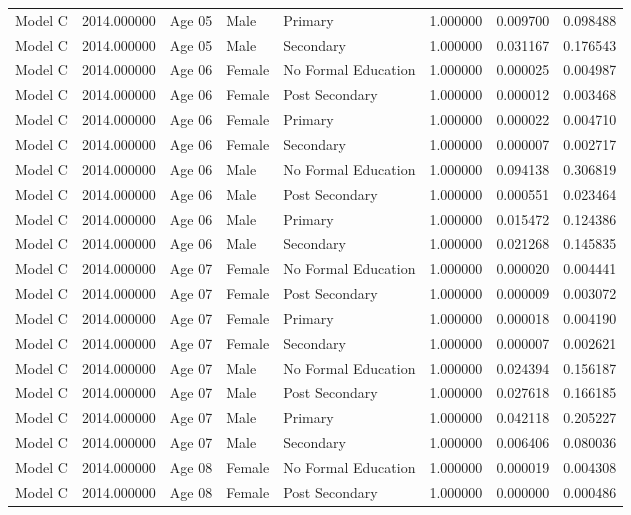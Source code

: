 \begin{table}[ht]
\begin{tabular}{lrlllrrr}
Model C & 2014.000000 & Age 05 & Male & Primary & 1.000000 & 0.009700 & 0.098488 \\
Model C & 2014.000000 & Age 05 & Male & Secondary & 1.000000 & 0.031167 & 0.176543 \\
Model C & 2014.000000 & Age 06 & Female & No Formal Education & 1.000000 & 0.000025 & 0.004987 \\
Model C & 2014.000000 & Age 06 & Female & Post Secondary & 1.000000 & 0.000012 & 0.003468 \\
Model C & 2014.000000 & Age 06 & Female & Primary & 1.000000 & 0.000022 & 0.004710 \\
Model C & 2014.000000 & Age 06 & Female & Secondary & 1.000000 & 0.000007 & 0.002717 \\
Model C & 2014.000000 & Age 06 & Male & No Formal Education & 1.000000 & 0.094138 & 0.306819 \\
Model C & 2014.000000 & Age 06 & Male & Post Secondary & 1.000000 & 0.000551 & 0.023464 \\
Model C & 2014.000000 & Age 06 & Male & Primary & 1.000000 & 0.015472 & 0.124386 \\
Model C & 2014.000000 & Age 06 & Male & Secondary & 1.000000 & 0.021268 & 0.145835 \\
Model C & 2014.000000 & Age 07 & Female & No Formal Education & 1.000000 & 0.000020 & 0.004441 \\
Model C & 2014.000000 & Age 07 & Female & Post Secondary & 1.000000 & 0.000009 & 0.003072 \\
Model C & 2014.000000 & Age 07 & Female & Primary & 1.000000 & 0.000018 & 0.004190 \\
Model C & 2014.000000 & Age 07 & Female & Secondary & 1.000000 & 0.000007 & 0.002621 \\
Model C & 2014.000000 & Age 07 & Male & No Formal Education & 1.000000 & 0.024394 & 0.156187 \\
Model C & 2014.000000 & Age 07 & Male & Post Secondary & 1.000000 & 0.027618 & 0.166185 \\
Model C & 2014.000000 & Age 07 & Male & Primary & 1.000000 & 0.042118 & 0.205227 \\
Model C & 2014.000000 & Age 07 & Male & Secondary & 1.000000 & 0.006406 & 0.080036 \\
Model C & 2014.000000 & Age 08 & Female & No Formal Education & 1.000000 & 0.000019 & 0.004308 \\
Model C & 2014.000000 & Age 08 & Female & Post Secondary & 1.000000 & 0.000000 & 0.000486 \\

\end{tabular}
\end{table}
